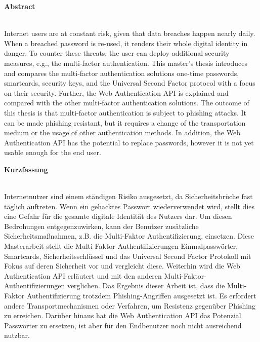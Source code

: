 \thispagestyle{noheader}
\setlength{\columnsep}{1cm}

{}

\begin{multicols}{2}
	\begin{large}
		\textbf{Abstract} \\ \\
	\end{large}
	Internet users are at constant risk, given that data breaches happen nearly daily. When a breached password is re-used, it renders their whole digital identity in danger. To counter these threats, the user can deploy additional security measures, e.g., the multi-factor authentication. This master's thesis introduces and compares the multi-factor authentication solutions one-time passwords, smartcards, security keys, and the Universal Second Factor protocol with a focus on their security. Further, the Web Authentication API is explained and compared with the other multi-factor authentication solutions. The outcome of this thesis is that multi-factor authentication is subject to phishing attacks. It can be made phishing resistant, but it requires a change of the transportation medium or the usage of other authentication methods. In addition, the Web Authentication API has the potential to replace passwords, however it is not yet usable enough for the end user.
	\columnbreak \\
	\begin{large}
		\textbf{Kurzfassung} \\ \\
	\end{large}
	Internetnutzer sind einem ständigen Risiko ausgesetzt, da Sicherheitsbrüche fast täglich auftreten. Wenn ein gehacktes Passwort wiederverwendet wird, stellt dies eine Gefahr für die gesamte digitale Identität des Nutzers dar. Um diesen Bedrohungen entgegenzuwirken, kann der Benutzer zusätzliche Sicherheitsmaßnahmen, z.B. die Multi-Faktor Authentifizierung, einsetzen. Diese Masterarbeit stellt die Multi-Faktor Authentifizierungen Einmalpasswörter, Smartcards, Sicherheitsschlüssel und das Universal Second Factor Protokoll mit Fokus auf deren Sicherheit vor und vergleicht diese. Weiterhin wird die Web Authentication API erläutert und mit den anderen Multi-Faktor-Authentifizierungen verglichen. Das Ergebnis dieser Arbeit ist, dass die Multi-Faktor Authentifizierung trotzdem Phishing-Angriffen ausgesetzt ist. Es erfordert andere Transportmechanismen oder Verfahren, um Resistenz gegenüber Phishing zu erreichen. Darüber hinaus hat die Web Authentication API das Potenzial Passwörter zu ersetzen, ist aber für den Endbenutzer noch nicht ausreichend nutzbar.
\end{multicols}

\addvspace{1.5cm}


\newpage
